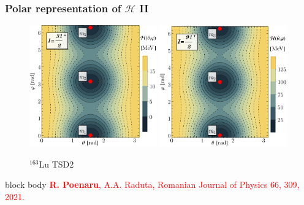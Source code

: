 \documentclass{beamer}
\begin{document}
\begin{frame}
	\frametitle{Polar representation of $\mathcal{H}$ II}
	\vspace{-1cm}
	\begin{figure}
		\centering
		\caption{$^{163}$Lu TSD2}
		\includegraphics[width=0.49\textwidth]{figures/parity-partners-plots/contour-tsd2-1.pdf}
		\includegraphics[width=0.49\textwidth]{figures/parity-partners-plots/contour-tsd2-2.pdf}
	\end{figure}
	\begin{beamercolorbox}[rounded=true,shadow=false, wd=\linewidth,]{block body}
		\centering
		\textcolor{red}{\footnotesize{\textbf{R. Poenaru}, A.A. Raduta, Romanian Journal of Physics 66, 309, 2021.}}
	\end{beamercolorbox}
\end{frame}
\end{document}
